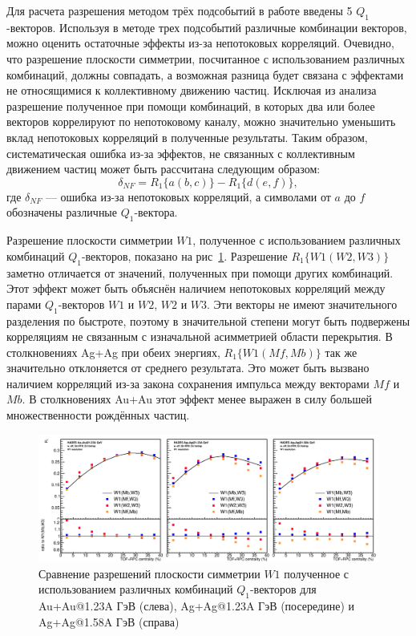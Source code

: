 Для расчета разрешения методом трёх подсобытий в работе введены 5 $Q_1$-векторов. 
Используя в методе трех подсобытий различные комбинации векторов, можно оценить остаточные эффекты из-за непотоковых корреляций. 
Очевидно, что разрешение плоскости симметрии, посчитанное с использованием различных комбинаций, должны совпадать, а возможная разница будет связана с эффектами не относящимися к коллективному движению частиц.
Исключая из анализа разрешение полученное при помощи комбинаций, в которых два или более векторов коррелируют по непотоковому каналу, можно значительно уменьшить вклад непотоковых корреляций в полученные результаты.
Таким образом, систематическая ошибка из-за эффектов, не связанных с коллективным движением частиц может быть рассчитана следующим образом:
\begin{equation}
    \delta_{NF} = R_1\{a(b,c)\} - R_1\{d(e,f)\},
\end{equation}
где $\delta_{NF}$ --- ошибка из-за непотоковых корреляций, а символами от $a$ до $f$ обозначены различные $Q_1$-вектора.

Разрешение плоскости симметрии $W1$, полученное с использованием различных комбинаций $Q_1$-векторов, показано на рис~\ref{fig:hades_w1_combinations}.
Разрешение $R_1\{W1(W2,W3)\}$ заметно отличается от значений, полученных при помощи других комбинаций. 
Этот эффект может быть объяснён наличием непотоковых корреляций между парами $Q_1$-векторов $W1$ и $W2$, $W2$ и $W3$.
Эти векторы не имеют значительного разделения по быстроте, поэтому в значительной степени могут быть подвержены корреляциям не связанным с изначальной асимметрией области перекрытия. 
В столкновениях Ag+Ag при обеих энергиях, $R_1\{W1(Mf,Mb)\}$ так же значительно отклоняется от среднего результата. 
Это может быть вызвано наличием корреляций из-за закона сохранения импульса между векторами $Mf$ и $Mb$. 
В столкновениях Au+Au этот эффект менее выражен в силу большей множественности рождённых частиц.
%
\begin{figure}[ht]
\begin{center}
\includegraphics[width=0.75\linewidth]{images/W1_combinations.png}
\caption{Сравнение разрешений плоскости симметрии $W1$ полученное с использованием различных комбинаций $Q_1$-векторов для Au+Au@1.23A ГэВ (слева), Ag+Ag@1.23A ГэВ (посередине) и Ag+Ag@1.58A ГэВ (справа)}
\label{fig:hades_w1_combinations}
\end{center}
\end{figure}

